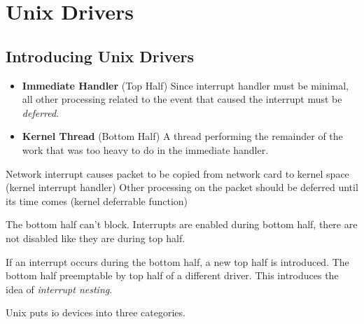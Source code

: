 
\chapter{Unix Drivers}


\section{Introducing Unix Drivers}


\begin{itemize}   
\renewcommand{\labelitemi}{$\Box$}
\item \textbf{Immediate Handler} (Top Half)
Since interrupt handler must be minimal, all other 
processing related to the event that caused the 
interrupt must be \textit{deferred}.
\item \textbf{Kernel Thread} (Bottom Half)
A thread performing the remainder of the work that 
was too heavy to do in the immediate handler. 
\end{itemize}

\begin{example}
Network interrupt causes packet to be copied from 
network card to kernel space (kernel interrupt handler)
Other processing on the packet should be deferred until 
its time comes (kernel deferrable function)
\end{example}

\frmrule

The bottom half can’t block. 
Interrupts are enabled during bottom half, 
there are not disabled like they are during top half.

If an interrupt occurs during the bottom half, 
a new top half is introduced. 
The bottom half preemptable by top half of a different driver.
This introduces the idea of \textit{interrupt nesting}.




Unix puts io devices into three categories.


\begin{figure}[h]
\end{figure}

